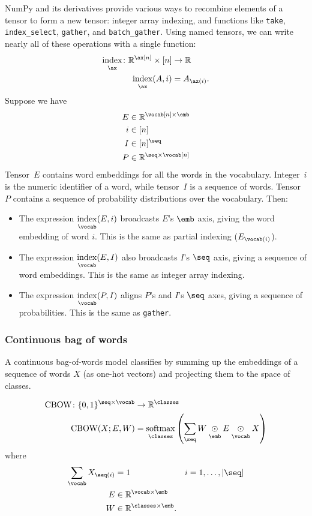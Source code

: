 \documentclass{article}
\newcommand{\reals}{\mathbb{R}}
\begin{document}
NumPy and its derivatives provide various ways to recombine elements of a tensor to form a new tensor: integer array indexing, and functions like \verb|take|, \verb|index_select|, \verb|gather|, and \verb|batch_gather|. Using named tensors, we can write nearly all of these operations with a single function:
\begin{align*}
  \nfun{\ax}{index} \colon \reals^{\ax[n]} \times [n] &\rightarrow \reals \\
  \nfun{\ax}{index}(A, i) &= A_{\ax(i)}.
\end{align*}
Suppose we have
\begin{align*}
  E &\in \reals^{\vocab[n] \times \emb} \\
  i &\in [n] \\
  I &\in [n]^{\seq} \\
  P &\in \reals^{\seq \times \vocab[n]}
\end{align*}
Tensor~$E$ contains word embeddings for all the words in the vocabulary. Integer~$i$ is the numeric identifier of a word, while tensor~$I$ is a sequence of words. Tensor~$P$ contains a sequence of probability distributions over the vocabulary. Then:
\begin{itemize}
\item The expression $\nfun{\vocab}{index}(E,i)$ broadcasts $E$'s $\emb$ axis, giving the word embedding of word $i$. This is the same as partial indexing ($E_{\vocab(i)}$).
\item The expression $\nfun{\vocab}{index}(E,I)$ also broadcasts $I$'s $\seq$ axis, giving a sequence of word embeddings. This is the same as integer array indexing.
\item The expression $\nfun{\vocab}{index}(P,I)$ aligns $P$'s and $I$'s $\seq$ axes, giving a sequence of probabilities. This is the same as \verb|gather|.
\end{itemize}

\subsubsection{Continuous bag of words}

A continuous bag-of-words model classifies by summing up the embeddings of a sequence of words $X$ (as one-hot vectors) and projecting them to the space of classes. 

\begin{align*}
\text{CBOW} \colon \{0, 1\}^{\seq \times \vocab} &\rightarrow \reals^{\classes} \\
\text{CBOW}(X; E, W) &= \nfun{\classes}{softmax} \left(\nsum{\seq} W \ndot{\emb} E \ndot{\vocab} X\right)
\end{align*}
where
\begin{align*}
\nsum{\vocab} X_{\seq(i)} &= 1 & i &= 1, \ldots, |\seq| \\
E &\in \reals^{\vocab \times \emb} \\
W &\in \reals^{\classes \times \emb}.
\end{align*}
\end{document}
